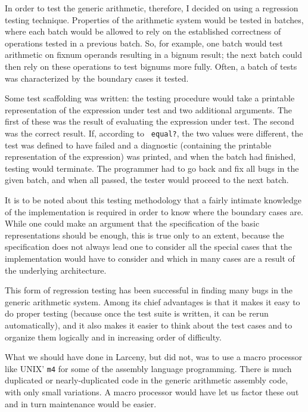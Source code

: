 In order to test the generic arithmetic, therefore, I decided on using a
regression testing technique. Properties of the arithmetic system would be
tested in batches, where each batch would be allowed to rely on the
established correctness of operations tested in a previous batch. So, for
example, one batch would test arithmetic on fixnum operands resulting in a
bignum result; the next batch could then rely on these operations to test
bignums more fully. Often, a batch of tests was characterized by the
boundary cases it tested. 

Some test scaffolding was written: the testing procedure would take a
printable representation of the expression under test and two additional
arguments. The first of these was the result of evaluating the expression
under test. The second was the correct result. If, according to {\tt
equal?}, the two values were different, the test was defined to have failed
and a diagnostic (containing the printable representation of the expression)
was printed, and when the batch had finished, testing would terminate. The
programmer had to go back and fix all bugs in the given batch, and when all
passed, the tester would proceed to the next batch.

It is to be noted about this testing methodology that a fairly intimate
knowledge of the implementation is required in order to know where the
boundary cases are. While one could make an argument that the specification
of the basic representations should be enough, this is true only to an
extent, because the specification does not always lead one to consider all
the special cases that the implementation would have to consider and which
in many cases are a result of the underlying architecture.

This form of regression testing has been successful in finding many bugs
in the generic arithmetic system. Among its chief advantages is that it
makes it easy to do proper testing (because once the test suite is written,
it can be rerun automatically), and it also makes it easier to think about
the test cases and to organize them logically and in increasing order of
difficulty.

What we should have done in Larceny, but did not, was to use a macro
processor like UNIX' {\tt m4} for some of the assembly language programming.
There is much duplicated or nearly-duplicated code in the generic arithmetic
assembly code, with only small variations. A macro processor would have let
us factor these out and in turn maintenance would be easier.


